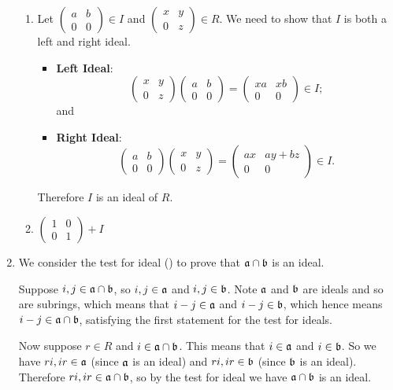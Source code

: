 \begin{enumerate}
\begin{enumerate}[label=(\roman*)]
        \item Let $\begin{pmatrix}a&b\\0&0\end{pmatrix} \in I$ and $\begin{pmatrix}x&y\\0&z\end{pmatrix} \in R$. We need to show that $I$ is both a left and right ideal.
        \begin{itemize}
            \item \textbf{Left Ideal}:
            \[
                \begin{pmatrix}x&y\\0&z\end{pmatrix}\begin{pmatrix}a&b\\0&0\end{pmatrix} = \begin{pmatrix}xa&xb\\0&0\end{pmatrix} \in I;
            \]
            and
            \item \textbf{Right Ideal}: \[
                \begin{pmatrix}a&b\\0&0\end{pmatrix}\begin{pmatrix}x&y\\0&z\end{pmatrix} = \begin{pmatrix}ax&ay+bz\\0&0\end{pmatrix} \in I.
            \]
        \end{itemize}
        Therefore $I$ is an ideal of $R$.

        \item $\begin{pmatrix}1&0\\0&1\end{pmatrix} + I$
    \end{enumerate}

    \item We consider the test for ideal () to prove that $\mathfrak{a}\cap\mathfrak{b}$ is an ideal.
    
    Suppose $i,j\in\mathfrak{a}\cap\mathfrak{b}$, so $i,j \in \mathfrak{a}$ and $i,j \in \mathfrak{b}$. Note $\mathfrak{a}$ and $\mathfrak{b}$ are ideals and so are subrings, which means that $i-j \in \mathfrak{a}$ and $i-j \in \mathfrak{b}$, which hence means $i-j \in \mathfrak{a}\cap\mathfrak{b}$, satisfying the first statement for the test for ideals.

    Now suppose $r \in R$ and $i \in \mathfrak{a}\cap\mathfrak{b}$. This means that $i \in \mathfrak{a}$ and $i \in \mathfrak{b}$. So we have $ri, ir \in \mathfrak{a}$ (since $\mathfrak{a}$ is an ideal) and $ri, ir \in \mathfrak{b}$ (since $\mathfrak{b}$ is an ideal). Therefore $ri,ir \in \mathfrak{a}\cap\mathfrak{b}$, so by the test for ideal we have $\mathfrak{a}\cap\mathfrak{b}$ is an ideal.
\end{enumerate}

